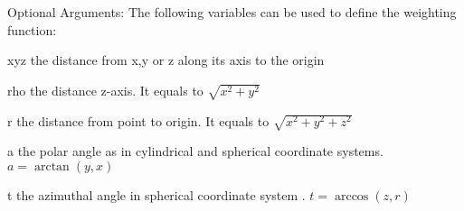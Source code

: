 \begin{FontDescr}{Optional Arguments:}
 The following variables can be used to define the weighting function:

\begin{FontPara}{x}{y}{z}
the distance from x,y or z along its axis to the origin
\end{FontPara}

\begin{FontPara}{rho}
the distance z-axis. It equals to $\sqrt{x^{2}+y^{2}}$
\end{FontPara}

\begin{FontPara}{r}
the distance from point to origin. It equals to $\sqrt{x^{2}+y^{2}+z^{2}}$ 
\end{FontPara}

\begin{FontPara}{a}
the polar angle as in cylindrical and spherical coordinate systems. $a=\arctan(y,x)$
\end{FontPara}

\begin{FontPara}{t}
the azimuthal angle in spherical coordinate system . $t=\arccos (z,r)$
\end{FontPara}

\end{FontDescr}


